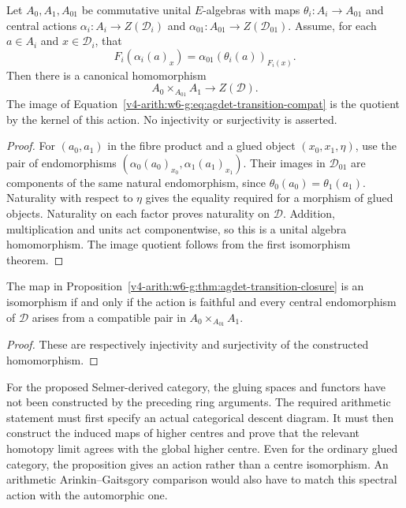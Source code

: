 \begin{proposition}
\label{v4-arith:w6-g:thm:agdet-transition-closure}
Let $A_0,A_1,A_{01}$ be commutative unital $E$-algebras with maps
$\theta_i:A_i\to A_{01}$ and central actions
$\alpha_i:A_i\to Z(\mathcal D_i)$ and
$\alpha_{01}:A_{01}\to Z(\mathcal D_{01})$.
Assume, for each $a\in A_i$ and $x\in\mathcal D_i$, that
\[
 F_i(\alpha_i(a)_x)
   =\alpha_{01}(\theta_i(a))_{F_i(x)}.
\]
Then there is a canonical homomorphism
\begin{equation}
\label{v4-arith:w6-g:eq:agdet-transition-compat}
 A_0\times_{A_{01}}A_1\longrightarrow Z(\mathcal D).
\end{equation}
The image of Equation~\eqref{v4-arith:w6-g:eq:agdet-transition-compat}
is the quotient by the kernel of this action.
No injectivity or surjectivity is asserted.
\end{proposition}

\begin{proof}
For $(a_0,a_1)$ in the fibre product and a glued object
$(x_0,x_1,\eta)$, use the pair of endomorphisms
$(\alpha_0(a_0)_{x_0},\alpha_1(a_1)_{x_1})$.
Their images in $\mathcal D_{01}$ are components of the same
natural endomorphism, since $\theta_0(a_0)=\theta_1(a_1)$.
Naturality with respect to $\eta$ gives the equality required for
a morphism of glued objects.
Naturality on each factor proves naturality on $\mathcal D$.
Addition, multiplication and units act componentwise, so this is a
unital algebra homomorphism. The image quotient follows from the
first isomorphism theorem.
\end{proof}

\begin{corollary}
\label{v4-arith:w6-g:cor:agdet-closed}
The map in
Proposition~\ref{v4-arith:w6-g:thm:agdet-transition-closure} is an
isomorphism if and only if the action is faithful and every central
endomorphism of $\mathcal D$ arises from a compatible pair in
$A_0\times_{A_{01}}A_1$.
\end{corollary}

\begin{proof}
These are respectively injectivity and surjectivity of the
constructed homomorphism.
\end{proof}

\begin{remark}
\label{v4-arith:w6-g:rem:agdet-domain}
For the proposed Selmer-derived category, the gluing spaces and
functors have not been constructed by the preceding ring arguments.
The required arithmetic statement must first specify an actual
categorical descent diagram. It must then construct the induced
maps of higher centres and prove that the relevant homotopy limit
agrees with the global higher centre. Even for the ordinary glued
category, the proposition gives an action rather than a centre
isomorphism. An arithmetic Arinkin--Gaitsgory comparison would
also have to match this spectral action with the automorphic one.
\end{remark}

